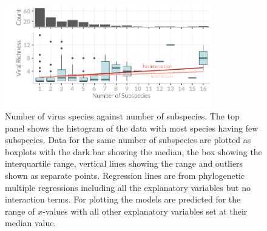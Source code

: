 		
		























\begin{knitrout}\footnotesize
{}\color{fgcolor}\begin{figure}[t]

{\centering \includegraphics[width=0.8\textwidth]{figure/boxplot-1} 

}

\caption[Number of virus species against number of subspecies]{Number of virus species against number of subspecies. 		
The top panel shows the histogram of the data with most species having few subspecies.		
Data for the same number of subspecies are plotted as boxplots with the dark bar showing the median, the box showing the interquartile range, vertical lines showing the range and outliers shown as separate points.		
Regression lines are from phylogenetic multiple regressions including all the explanatory variables but no interaction terms.
For plotting the models are predicted for the range of $x$-values with all other explanatory variables set at their median value.			
}\label{fig:boxplot}
\end{figure}


\end{knitrout}




